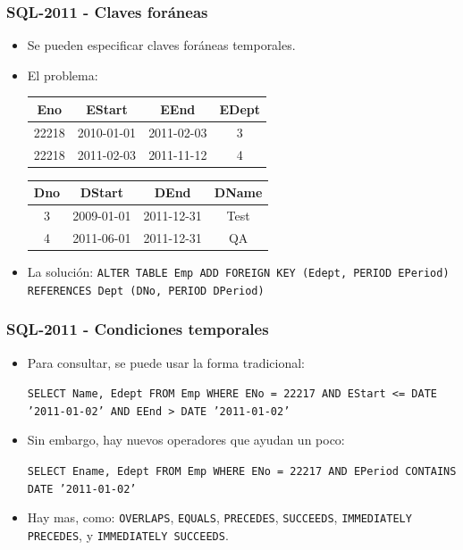 \begin{frame}
\frametitle{SQL-2011 - Claves foráneas}
	\begin{itemize}
	\item	Se pueden especificar claves foráneas temporales.
		\pause

	\item	El problema:
		\hfill \begin{tabular}{|c|c|c|c|}
		\hline
		Eno	& EStart	& EEnd		& EDept	\\ \hline
		22218	& 2010-01-01	& 2011-02-03	& 3	\\ \hline
		22218	& 2011-02-03	& 2011-11-12	& 4	\\ \hline
		\end{tabular}

		\hfill \begin{tabular}{|c|c|c|c|}
		\hline
		Dno	& DStart	& DEnd		& DName	\\ \hline
		3	& 2009-01-01	& 2011-12-31	& Test	\\ \hline
		4	& 2011-06-01	& 2011-12-31	& QA	\\ \hline
		\end{tabular}
		\pause

	\item	La solución: \texttt{ALTER TABLE Emp ADD FOREIGN KEY (Edept,
			PERIOD EPeriod) REFERENCES Dept (DNo, PERIOD DPeriod)}
	\end{itemize}
\end{frame}

\begin{frame}
\frametitle{SQL-2011 - Condiciones temporales}
	\begin{itemize}
	\item	Para consultar, se puede usar la forma tradicional:

		\texttt{SELECT Name, Edept FROM Emp WHERE ENo = 22217
		AND EStart <= DATE '2011-01-02' AND EEnd > DATE '2011-01-02'}
	\pause

	\item	Sin embargo, hay nuevos operadores que ayudan un poco:

		\texttt{SELECT Ename, Edept FROM Emp WHERE ENo = 22217
		AND EPeriod CONTAINS DATE '2011-01-02'}
	\pause

	\item	Hay mas, como: \texttt{OVERLAPS}, \texttt{EQUALS}, \texttt{PRECEDES},
		\texttt{SUCCEEDS}, \texttt{IMMEDIATELY PRECEDES},
		y \texttt{IMMEDIATELY SUCCEEDS}.
	\end{itemize}
\end{frame}

